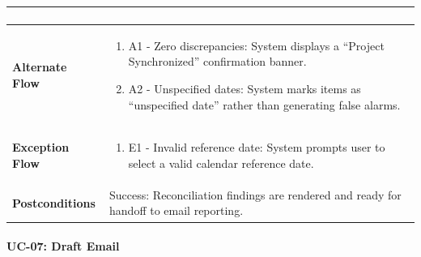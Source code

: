 \begin{longtable}{>{\raggedright\arraybackslash}p{}>{\raggedright\arraybackslash}p{}}
\begin{enumerate}[nosep,leftmargin=*,label=\arabic*.]
\end{enumerate} \\ \hline

\textbf{Alternate Flow} & \begin{enumerate}[nosep,leftmargin=*,label=\arabic*.]

    \item A1 - Zero discrepancies: System displays a ``Project Synchronized'' confirmation banner.

    \item A2 - Unspecified dates: System marks items as ``unspecified date'' rather than generating false alarms.

\end{enumerate} \\ \hline

\textbf{Exception Flow} & \begin{enumerate}[nosep,leftmargin=*,label=\arabic*.]

    \item E1 - Invalid reference date: System prompts user to select a valid calendar reference date.

\end{enumerate} \\ \hline

\textbf{Postconditions} & Success: Reconciliation findings are rendered and ready for handoff to email reporting. \\ \hline

\end{longtable}

\endgroup





\paragraph*{UC-07: Draft Email}

\begingroup

\small

\setlength{\tabcolsep}{5pt}

\renewcommand{\arraystretch}{1.1}

